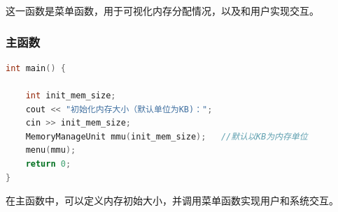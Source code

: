 \documentclass[UTF8]{ctexart}
\begin{document}
这一函数是菜单函数，用于可视化内存分配情况，以及和用户实现交互。

\subsubsection{主函数}
\begin{lstlisting}[frame=shadowbox, language=C]
int main() {
    
    int init_mem_size;
    cout << "初始化内存大小（默认单位为KB)：";
    cin >> init_mem_size;
    MemoryManageUnit mmu(init_mem_size);   //默认以KB为内存单位
    menu(mmu);
	return 0;
}
\end{lstlisting}

在主函数中，可以定义内存初始大小，并调用菜单函数实现用户和系统交互。
\end{document}
